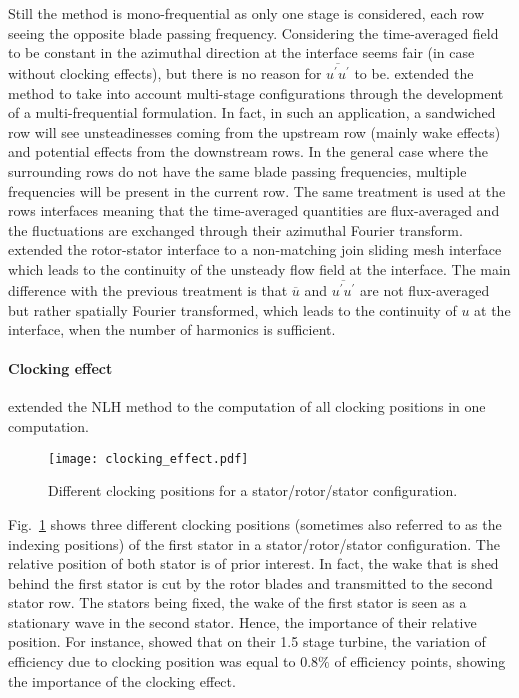 Still the method is mono-frequential as only
one stage is considered, each row seeing the
opposite blade passing frequency. Considering
the time-averaged field to be constant in the azimuthal 
direction at the interface seems fair (in case 
without clocking effects), 
but there is
no reason for $\overline{u^\prime u^\prime}$ to be.
\citet{He2002} extended the method to take into
account multi-stage configurations through the
development of a multi-frequential formulation.
In fact, in such an application, 
a sandwiched row will see unsteadinesses coming
from the upstream row (mainly wake effects) and
potential effects from the downstream rows. In the
general case where the surrounding rows do not have the
same blade passing frequencies, multiple frequencies
will be present in the current row.
The same treatment is used at the rows interfaces meaning
that the time-averaged quantities are flux-averaged and the
fluctuations are exchanged through their azimuthal
Fourier transform.
\citet{Vilmin2006} extended the rotor-stator
interface to a non-matching join sliding mesh interface which
leads to the continuity of the unsteady flow field at the interface.
The main difference with the previous treatment is that
$\overline{u}$ and $\overline{u^\prime u^\prime}$ 
are not flux-averaged but rather spatially Fourier transformed,
which leads to the continuity of $u$ at the interface, when
the number of harmonics is sufficient.

\paragraph{Clocking effect}
\citet{He2002} extended the NLH method to
the computation of all clocking positions in one computation.
\begin{figure}[htbp]
  \centering 
  \texttt{[image: clocking\_effect.pdf]}
  \caption{Different clocking positions for a stator/rotor/stator
  configuration.}
  \label{fig:sm_nlh_clocking_effect}
\end{figure}
Fig.~\ref{fig:sm_nlh_clocking_effect} shows three
different clocking positions (sometimes also referred 
to as the indexing positions)
of the first stator
in a stator/rotor/stator configuration.
The relative position of both stator is of
prior interest. In fact, the wake that is shed behind the first stator
is cut by the rotor blades and transmitted to 
the second stator row. The stators being fixed, the wake of
the first stator is seen as a stationary wave in the second stator.
Hence, the importance of their relative position. For instance,
\citet{Huber1996} showed that
on their 1.5 stage turbine, the variation of efficiency due to clocking
position was equal to $0.8\%$ of efficiency points, showing the
importance of the clocking effect.


